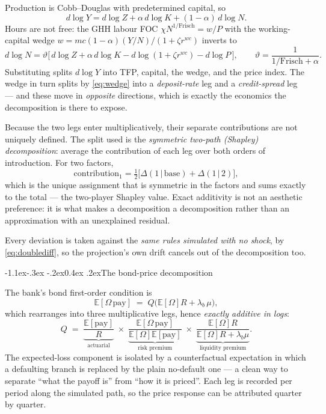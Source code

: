 \documentclass[10pt,a4paper]{article}
\makeatletter
\theoremstyle{definition}
\theoremstyle{plain}
\theoremstyle{remark}
\newcommand{\E}{\mathbb{E}}
\renewcommand\subsection{\@startsection{subsection}{2}{\z@}%
  {-1.1ex\@plus -.3ex \@minus -.2ex}{0.4ex \@plus .2ex}{\normalfont\normalsize\bfseries}}
\makeatother
\begin{document}
Production is Cobb--Douglas with predetermined capital, so
\begin{equation}
  d\log Y = d\log Z + \alpha\, d\log K + (1-\alpha)\, d\log N .
\end{equation}
Hours are not free: the GHH labour FOC $\chi N^{1/\text{Frisch}} = w/P$ with the
working-capital wedge $w = mc(1-\alpha)(Y/N)/(1+\zeta r^{wc})$ inverts to
\begin{equation}
  d\log N = \vartheta\Big[\,d\log Z + \alpha\,d\log K - d\log(1+\zeta r^{wc}) - d\log P\,\Big],
  \qquad \vartheta = \frac{1}{1/\text{Frisch}+\alpha}.
\end{equation}
Substituting splits $d\log Y$ into TFP, capital, the wedge, and the price index. The wedge in
turn splits by \eqref{eq:wedge} into a \emph{deposit-rate} leg and a \emph{credit-spread} leg
--- and these move in \emph{opposite} directions, which is exactly the economics the
decomposition is there to expose.

Because the two legs enter multiplicatively, their separate contributions are not uniquely
defined. The split used is the \emph{symmetric two-path (Shapley) decomposition}: average the
contribution of each leg over both orders of introduction. For two factors,
\begin{equation}
  \text{contribution}_1 = \tfrac12\big[\Delta(1\,|\,\text{base}) + \Delta(1\,|\,2)\big],
\end{equation}
which is the unique assignment that is symmetric in the factors and sums exactly to the total
--- the two-player Shapley value. Exact additivity is not an aesthetic preference: it is what
makes a decomposition a decomposition rather than an approximation with an unexplained
residual.

Every deviation is taken against the \emph{same rules simulated with no shock}, by
\eqref{eq:doublediff}, so the projection's own drift cancels out of the decomposition too.

\subsection{The bond-price decomposition}

The bank's bond first-order condition is
\begin{equation}
  \E[\Omega\, \text{pay}] \;=\; Q\big(\E[\Omega]R + \lambda_b\,\mu\big),
\end{equation}
which rearranges into three multiplicative legs, hence \emph{exactly additive in logs}:
\begin{equation}
  Q \;=\;
  \underbrace{\frac{\E[\text{pay}]}{R}}_{\text{actuarial}}\;\times\;
  \underbrace{\frac{\E[\Omega\,\text{pay}]}{\E[\Omega]\E[\text{pay}]}}_{\text{risk premium}}\;\times\;
  \underbrace{\frac{\E[\Omega]R}{\E[\Omega]R + \lambda_b\mu}}_{\text{liquidity premium}} .
\end{equation}
The expected-loss component is isolated by a counterfactual expectation in which a defaulting
branch is replaced by the plain no-default one --- a clean way to separate ``what the payoff
is'' from ``how it is priced''. Each leg is recorded per period along the simulated path, so
the price response can be attributed quarter by quarter.
\end{document}
